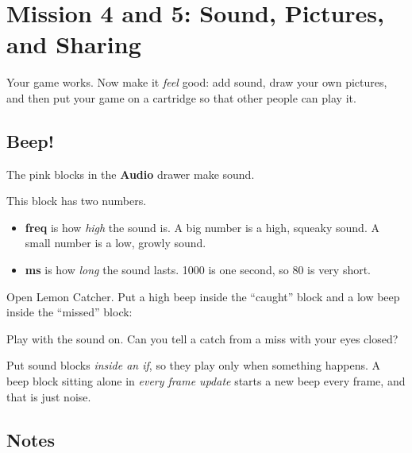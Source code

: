 \chapter{Mission 4 and 5: Sound, Pictures, and Sharing}
\label{ch:kids3}

Your game works. Now make it \emph{feel} good: add sound, draw your own
pictures, and then put your game on a cartridge so that other people can play
it.

\section{Beep!}

The pink blocks in the \textbf{Audio} drawer make sound.


This block has two numbers.

\begin{itemize}
  \item \textbf{freq} is how \emph{high} the sound is. A big number is a high,
        squeaky sound. A small number is a low, growly sound.
  \item \textbf{ms} is how \emph{long} the sound lasts. 1000 is one second, so
        80 is very short.
\end{itemize}

\begin{prgmission}
Open Lemon Catcher. Put a high beep inside the ``caught'' block and a low beep
inside the ``missed'' block:



Play with the sound on. Can you tell a catch from a miss with your eyes closed?
\end{prgmission}

\begin{prgwarn}
Put sound blocks \emph{inside an if}, so they play only when something
happens. A beep block sitting alone in \emph{every frame update} starts a new
beep every frame, and that is just noise.
\end{prgwarn}

\section{Notes}

